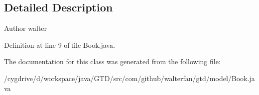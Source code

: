 \subsection{Detailed Description}
\begin{DoxyAuthor}{Author}
walter 
\end{DoxyAuthor}


Definition at line 9 of file Book.\-java.



The documentation for this class was generated from the following file\-:\begin{DoxyCompactItemize}
\item 
/cygdrive/d/workspace/java/\-G\-T\-D/src/com/github/walterfan/gtd/model/Book.\-java\end{DoxyCompactItemize}
